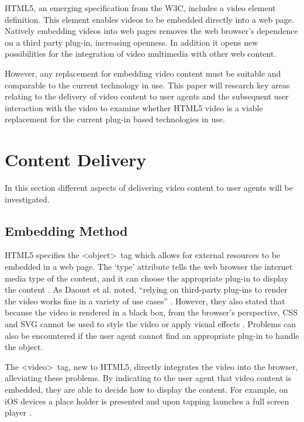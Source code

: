 \documentclass[journal]{IEEEtran}
\begin{document}
HTML5, an emerging specification from the W3C, includes a video element definition. This element enables videos to be embedded directly into a web page\cite{standard:html5}. Natively embedding videos into web pages removes the web browser's dependence on a third party plug-in, increasing openness. %
In addition it opens new possibilities for the integration of video multimedia with other web content.

However, any replacement for embedding video content must be suitable and comparable to the current technology in use. This paper will research key areas relating to the delivery of video content to user agents and the subsequent user interaction with the video to examine whether HTML5 video is a viable replacement for the current plug-in based technologies in use.

\section{Content Delivery}
In this section different aspects of delivering video content to user agents will be investigated.

\subsection{Embedding Method} 
HTML5 specifies the \textless object\textgreater~tag which allows for external resources to be embedded in a web page. The `type' attribute tells the web browser the internet media type of the content, and it can choose the appropriate plug-in to display the content \cite{standard:html5}. As Daoust et al. noted, ``relying on third-party plug-ins to render the video works fine in a variety of use cases'' \cite{article:towardsVideoOnTheWebWithHTML5}. However, they also stated that because the video is rendered in a black box, from the browser's perspective, CSS and SVG cannot be used to style the video or apply visual effects \cite{article:towardsVideoOnTheWebWithHTML5}. Problems can also be encountered if the user agent cannot find an appropriate plug-in to handle the object.

The \textless video\textgreater~tag, new to HTML5, directly integrates the video into the browser, alleviating these problems. By indicating to the user agent that video content is embedded, they are able to decide how to display the content. For example, on iOS devices a place holder is presented and upon tapping launches a full screen player \cite{website:safariHTML5}.
\end{document}
